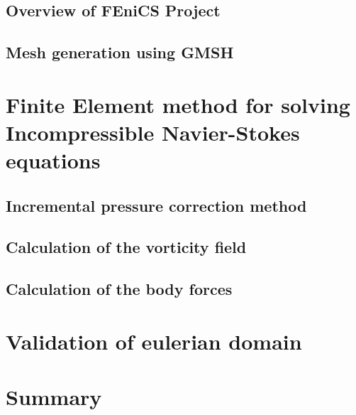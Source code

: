\subsection{Overview of FEniCS Project}

\subsection{Mesh generation using GMSH}


\section{Finite Element method for solving Incompressible Navier-Stokes equations}


\subsection{Incremental pressure correction method}

\subsection{Calculation of the vorticity field}

\subsection{Calculation of the body forces}


\section{Validation of eulerian domain}

\section{Summary}


